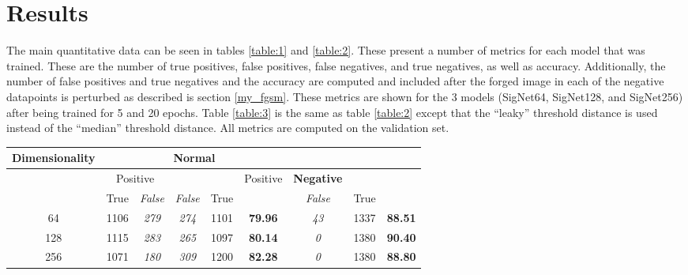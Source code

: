 \section{Results}\label{sec:results}

The main quantitative data can be seen in tables \ref{table:1} and \ref{table:2}.
These present a number of metrics for each model that was trained.
These are the number of true positives, false positives, false negatives, and true negatives, as well as accuracy.
Additionally, the number of false positives and true negatives and the accuracy are computed and included after the forged image in each of the negative datapoints is perturbed as described is section \ref{my_fgsm}.
These metrics are shown for the 3 models (SigNet64, SigNet128, and SigNet256) after being trained for 5 and 20 epochs.
Table \ref{table:3} is the same as table \ref{table:2} except that the ``leaky'' threshold distance is used instead of the ``median'' threshold distance.
All metrics are computed on the validation set.

\begin{table*}[t]
    \centering
    \begin{tabular}{|c | c >{\em}c | >{\em}c c | >{\bfseries}c | >{\em}c c >{\bfseries}c|}
        \hline
        \multirow{3}{*}{Dimensionality} & \multicolumn{5}{c|}{Normal} & \multicolumn{3}{c|}{Adversarial}\\
        \hline
        & \multicolumn{2}{c|}{Positive} & \multicolumn{2}{c|}{Negative} & \multirow{2}{*}{Accuracy} & Positive & Negative & \multirow{2}{*}{Accuracy}\\
        & True & False & False & True & & False & True & \\
        \hline
        64 & 1106 & 279 & 274 & 1101 & 79.96 & 43 & 1337 & 88.51\\
        128 & 1115 & 283 & 265 & 1097 & 80.14 & 0 & 1380 & 90.40\\
        256 & 1071 & 180 & 309 & 1200 & 82.28 & 0 & 1380 & 88.80\\
        \hline
    \end{tabular}
    \caption{Comparison of Accuracy using Latent Vector Sizes after 5 Epochs}
    \label{table:1}
\end{table*}

